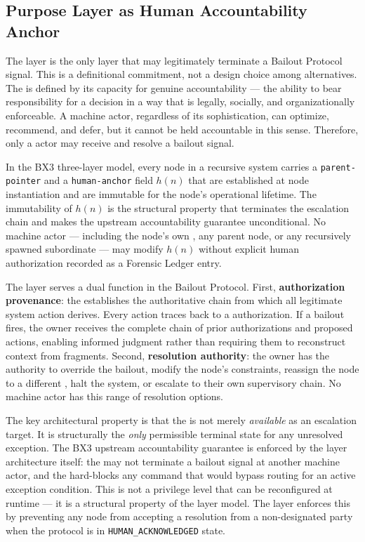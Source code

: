 \subsection{Purpose Layer as Human Accountability Anchor}
\label{sec:purpose-anchor}

The \purpose{} layer is the only layer that may legitimately terminate a Bailout Protocol signal. This is a definitional commitment, not a design choice among alternatives. The \purpose{} is defined by its capacity for genuine accountability — the ability to bear responsibility for a decision in a way that is legally, socially, and organizationally enforceable. A machine actor, regardless of its sophistication, can optimize, recommend, and defer, but it cannot be held accountable in this sense. Therefore, only a \purpose{} actor may receive and resolve a bailout signal.

In the BX3 three-layer model, every node in a recursive system carries a \texttt{parent-pointer} and a \texttt{human-anchor} field $h(n)$ that are established at node instantiation and are immutable for the node's operational lifetime. The immutability of $h(n)$ is the structural property that terminates the escalation chain and makes the upstream accountability guarantee unconditional. No machine actor — including the node's own \bounds{}, any parent node, or any recursively spawned subordinate — may modify $h(n)$ without explicit human authorization recorded as a Forensic Ledger entry.

The \purpose{} layer serves a dual function in the Bailout Protocol. First, \textbf{authorization provenance}: the \purpose{} establishes the authoritative chain from which all legitimate system action derives. Every \bounds{} action traces back to a \purpose{} authorization. If a bailout fires, the \purpose{} owner receives the complete chain of prior authorizations and proposed actions, enabling informed judgment rather than requiring them to reconstruct context from fragments. Second, \textbf{resolution authority}: the \purpose{} owner has the authority to override the bailout, modify the node's constraints, reassign the node to a different \bounds{}, halt the system, or escalate to their own supervisory chain. No machine actor has this range of resolution options.

The key architectural property is that the \purpose{} is not merely \textit{available} as an escalation target. It is structurally the \textit{only} permissible terminal state for any unresolved exception. The BX3 upstream accountability guarantee is enforced by the layer architecture itself: the \bounds{} may not terminate a bailout signal at another machine actor, and the \fact{} hard-blocks any command that would bypass \purpose{} routing for an active exception condition. This is not a privilege level that can be reconfigured at runtime — it is a structural property of the layer model. The \purpose{} layer enforces this by preventing any node from accepting a resolution from a non-designated party when the protocol is in \texttt{HUMAN\_ACKNOWLEDGED} state.

